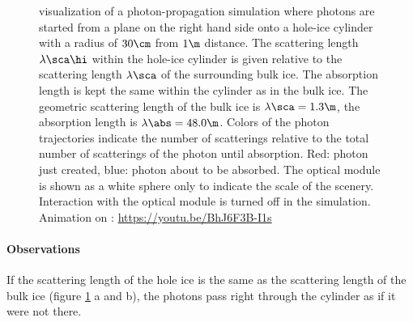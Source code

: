 \begin{figure}[htbp]
  \hfill
  \hfill
  \hfill
  \hfill
  \hfill
  \hfill
  \hfill
  \hfill
  \caption{\steamshovel visualization of a photon-propagation simulation where photons are started from a plane on the right hand side onto a hole-ice cylinder with a radius of $30\cm$ from $1\m$ distance. The scattering length $\lambda\sca\hi$ within the hole-ice cylinder is given relative to the scattering length $\lambda\sca$ of the surrounding bulk ice. The absorption length is kept the same within the cylinder as in the bulk ice. The geometric scattering length of the bulk ice is $\lambda\sca = 1.3\m$, the absorption length is $\lambda\abs = 48.0\m$. Colors of the photon trajectories indicate the number of scatterings relative to the total number of scatterings of the photon until absorption. Red: photon just created, blue: photon about to be absorbed. The optical module is shown as a white sphere only to indicate the scale of the scenery. Interaction with the optical module is turned off in the simulation. Animation on : \protect\url{https://youtu.be/BhJ6F3B-I1s}}
  \label{fig:Uo8kuo2z}
\end{figure}

\paragraph{Observations}
If the scattering length of the hole ice is the same as the scattering length of the bulk ice (figure \ref{fig:Uo8kuo2z} a and b), the photons pass right through the cylinder as if it were not there.

